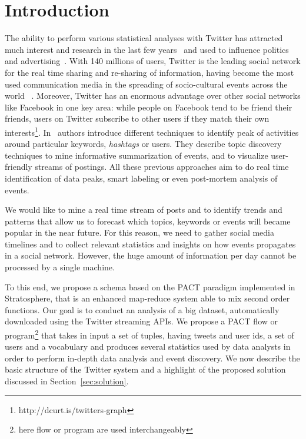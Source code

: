 \section{Introduction}
\label{sec:introduction}
The ability to perform various statistical analyses with Twitter has attracted much interest and research in the last few years~\cite{Hong:2012qy,Lehmann:2012kx} and used to influence politics~\cite{Tumasjan:2010vn} and advertising~\cite{Bakshy:2011ys}. 
With 140 millions of users, Twitter is the leading social network for the real time sharing and re-sharing of information, having become the most used communication media in the spreading of socio-cultural events across the world
~\cite{DBLP:journals:corr:abs-1003-2664}. 
Moreover, Twitter has an enormous advantage over other social networks like Facebook in one key area: while people on Facebook tend to be friend their friends, users on Twitter subscribe to other users if they match their own interests\footnote{http://dcurt.is/twitters-graph}.
In~\cite{DBLP:journals:corr:abs-1003-2664,Mathioudakis:2010:EOI:1718487.1718525,DBLP:conf:chi:MarcusBBKMM11} authors introduce different techniques to identify peak of activities around particular keywords, \emph{hashtags} or users.
They describe topic discovery techniques to mine informative summarization of events, and to visualize user-friendly  streams of postings.
All these previous approaches aim to do real time identification of data peaks, smart labeling or even post-mortem analysis of events.

We would like to mine a real time stream of posts and to identify trends and patterns that allow us to forecast which topics, keywords or events will became popular in the near future.
For this reason, we need to gather social media timelines and to collect relevant statistics and insights on how events propagates in a social network.
However, the huge amount of information per day cannot be processed by a single machine.

To this end, we propose a schema based on the PACT paradigm implemented in Stratosphere, that is an enhanced map-reduce system able to mix second order functions. 
Our goal is to conduct an analysis of a big dataset, automatically downloaded using the Twitter streaming APIs.
We propose a PACT flow or program\footnote{here flow or program are used interchangeably} that takes in input a set of tuples, having tweets and user ids, a set of users and a vocabulary and produces several statistics used by data analysts in order to perform in-depth data analysis and event discovery. 
We now describe the basic structure of the Twitter system and a highlight of the proposed solution discussed in Section~\ref{sec:solution}. 

